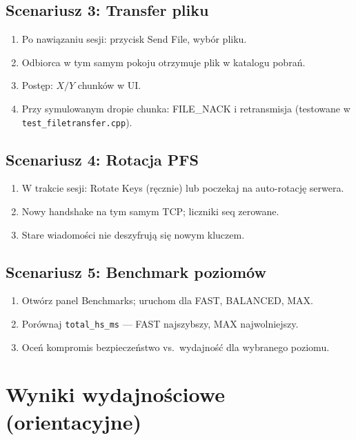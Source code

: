 \documentclass[12pt,a4paper]{article}
\begin{document}
\subsection{Scenariusz 3: Transfer pliku}

\begin{enumerate}
    \item Po nawiązaniu sesji: przycisk Send File, wybór pliku.
    \item Odbiorca w tym samym pokoju otrzymuje plik w katalogu pobrań.
    \item Postęp: $X/Y$ chunków w UI.
    \item Przy symulowanym dropie chunka: FILE\_NACK i retransmisja (testowane w \texttt{test\_filetransfer.cpp}).
\end{enumerate}

\subsection{Scenariusz 4: Rotacja PFS}

\begin{enumerate}
    \item W trakcie sesji: Rotate Keys (ręcznie) lub poczekaj na auto-rotację serwera.
    \item Nowy handshake na tym samym TCP; liczniki seq zerowane.
    \item Stare wiadomości nie deszyfrują się nowym kluczem.
\end{enumerate}

\subsection{Scenariusz 5: Benchmark poziomów}

\begin{enumerate}
    \item Otwórz panel Benchmarks; uruchom dla FAST, BALANCED, MAX.
    \item Porównaj \texttt{total\_hs\_ms} --- FAST najszybszy, MAX najwolniejszy.
    \item Oceń kompromis bezpieczeństwo vs.\ wydajność dla wybranego poziomu.
\end{enumerate}

\section{Wyniki wydajnościowe (orientacyjne)}
\end{document}
